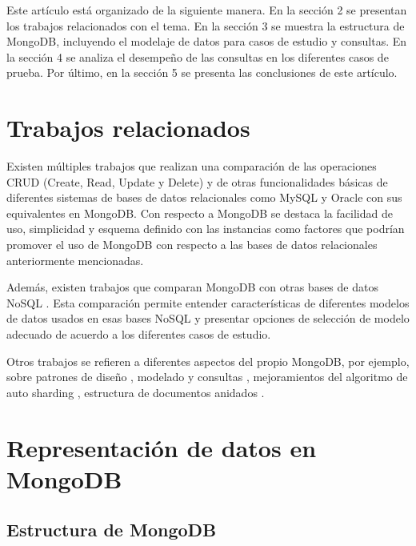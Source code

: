 \documentclass[conference,compsoc]{sty/IEEEtran}
\begin{document}
Este artículo está organizado de la siguiente manera. En la sección 2 se presentan los trabajos relacionados con el tema. En la sección 3 se muestra la estructura de MongoDB, incluyendo el modelaje de datos para casos de estudio y consultas. En la sección 4 se analiza el desempeño de las consultas en los diferentes casos de prueba. Por último, en la sección 5 se presenta las conclusiones de este artículo.  


\section{Trabajos relacionados}
Existen múltiples trabajos que realizan una comparación de las operaciones CRUD (Create, Read, Update y Delete) y de otras funcionalidades básicas de diferentes sistemas de bases de datos relacionales como MySQL\cite{CRUDMongoMySQL} y Oracle\cite{MongoDBvsOracle} con sus equivalentes en MongoDB. Con respecto a MongoDB se destaca la facilidad de uso, simplicidad y esquema definido con las instancias como factores que podrían promover el uso de MongoDB con respecto a las bases de datos relacionales anteriormente mencionadas.

Además, existen trabajos que comparan MongoDB con otras bases de datos NoSQL \cite{MongovsCassandravsCouch,NoSQLDatabases,TypesNoSQLDBs}. Esta comparación permite entender características de diferentes modelos de datos usados en esas bases NoSQL y  presentar opciones de selección de modelo adecuado de acuerdo a los diferentes casos de estudio.%

Otros trabajos se refieren a diferentes aspectos del propio MongoDB, por ejemplo, sobre patrones de diseño \cite{patronDiseno}, modelado y consultas \cite{AroraAggarwal,VeraBoa}, mejoramientos del algoritmo de auto sharding \cite{auto_sharding}, estructura de documentos anidados \cite{embedding}.

\section{Representación de datos en MongoDB}


\subsection{Estructura de MongoDB}
\end{document}

